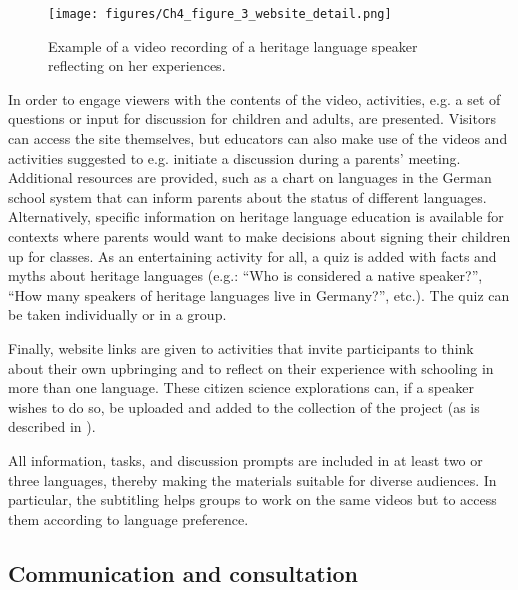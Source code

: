 \documentclass[output=paper,colorlinks,citecolor=brown]{langscibook}
\begin{document}
\begin{figure}
    \texttt{[image: figures/Ch4\_figure\_3\_website\_detail.png]}
    \caption{Example of a video recording of a heritage language speaker reflecting on her experiences.}
    \label{fig:purkarthoferetal:website-detail}
\end{figure}

In order to engage viewers with the contents of the video, activities, e.g. a set of questions or input for discussion for children and adults, are presented. Visitors can access the site themselves, but educators can also make use of the videos and activities suggested to e.g. initiate a discussion during a parents’ meeting. Additional resources are provided, such as a chart on languages in the German school system that can inform parents about the status of different languages. Alternatively, specific information on heritage language education is available for contexts where parents would want to make decisions about signing their children up for classes. As an entertaining activity for all, a quiz is added with facts and myths about heritage languages (e.g.: “Who is considered a native speaker?”, ``How many speakers of heritage languages live in Germany?'', etc.). The quiz can be taken individually or in a group.

Finally, website links are given to activities that invite participants to think about their own upbringing and to reflect on their experience with schooling in more than one language. These citizen science explorations can, if a speaker wishes to do so, be uploaded and added to the collection of the project (as is described in ).

All information, tasks, and discussion prompts are included in at least two or three languages, thereby making the materials suitable for diverse audiences. In particular, the subtitling helps groups to work on the same videos but to access them according to language preference.

\subsection{Communication and consultation} \label{sec:purkathoferetal:6.2}
\end{document}
